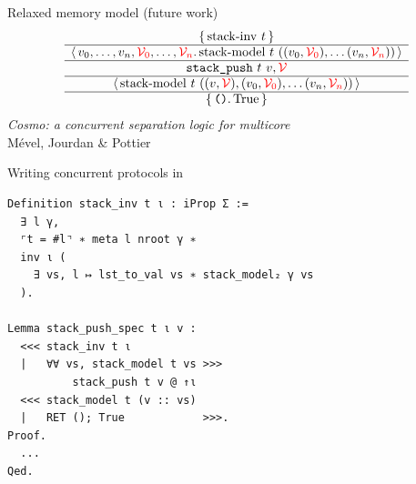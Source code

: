 \begin{frame}{Relaxed memory model (future work)}
\centering
\large
\[
    \begin{array}{c} \left\lbrace\, 
      \mathrm{stack {\hbox{-}} inv}\ t
     \,\right\rbrace \\ \hline \left\langle\, 
      v_0, \dots, v_n, \textcolor{red}{\mathcal{V}_0}, \dots, \textcolor{red}{\mathcal{V}_n}
     \ldotp 
      \mathrm{stack {\hbox{-}} model}\ t\ ((v_0, \textcolor{red}{\mathcal{V}_0}), \dots (v_n, \textcolor{red}{\mathcal{V}_n}))
     \,\right\rangle \\ \hline 
      \texttt{stack\_push}\ t\ v, \textcolor{red}{\mathcal{V}}
     \\ \hline \left\langle\, 
      \mathrm{stack {\hbox{-}} model}\ t\ ((v, \textcolor{red}{\mathcal{V}}), (v_0, \textcolor{red}{\mathcal{V}_0}), \dots (v_n, \textcolor{red}{\mathcal{V}_n}))
     \,\right\rangle \\ \hline \left\lbrace\, 
      \texttt{()}
     \ldotp 
      \mathrm{True}
     \,\right\rbrace \end{array}
\]
\vfill
\normalsize
\emph{Cosmo: a concurrent separation logic for multicore \OCaml} \\
Mével, Jourdan \& Pottier
\end{frame}

\begin{frame}[fragile]{Writing concurrent protocols in \Iris}
\small
\begin{verbatim}
Definition stack_inv t ι : iProp Σ :=
  ∃ l γ,
  ⌜t = #l⌝ ∗ meta l nroot γ ∗
  inv ι (
    ∃ vs, l ↦ lst_to_val vs ∗ stack_model₂ γ vs
  ).

Lemma stack_push_spec t ι v :
  <<< stack_inv t ι
  |   ∀∀ vs, stack_model t vs >>>
          stack_push t v @ ↑ι
  <<< stack_model t (v :: vs)
  |   RET (); True            >>>.
Proof.
  ...
Qed.
\end{verbatim}
\end{frame}